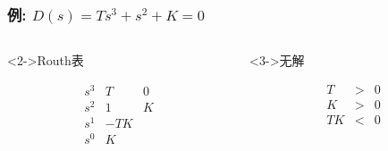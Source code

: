 \documentclass{beamer}
\begin{document}
\begin{frame}
\frametitle{例: $D(s)=Ts^{3}+s^{2}+K=0$}
\label{sec-5-2}
\begin{columns}
\begin{column}{0.5\textwidth}
\begin{block}<2->{Routh表}
\label{sec-5-2-1}

\[
\begin{matrix}
s^{3} & T  & 0\\
s^{2} & 1  & K \\
s^{1} & -TK \\
s^{0} & K 
\end{matrix}
\]
\end{block}
\end{column}
\begin{column}{0.5\textwidth}
\begin{block}<3->{无解}
\label{sec-5-2-2}

\begin{eqnarray*}
T & > & 0 \\
K & > & 0 \\
TK& < & 0 
\end{eqnarray*}
\end{block}
\end{column}
\end{columns}
\end{frame}
\end{document}
